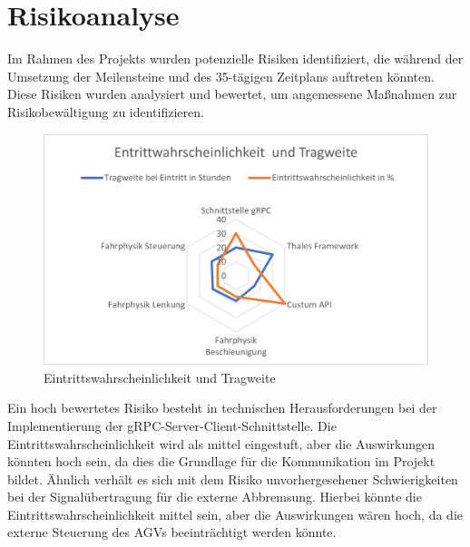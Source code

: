        



\section{Risikoanalyse}

Im Rahmen des Projekts wurden potenzielle Risiken identifiziert, die während der Umsetzung der Meilensteine und des 35-tägigen Zeitplans auftreten könnten. Diese Risiken wurden analysiert und bewertet, um angemessene Maßnahmen zur Risikobewältigung zu identifizieren.\\

\begin{figure}[htp]
    \centering
    \includegraphics[width=(\textwidth)]{images/Tragweite.png}
    \caption{Eintrittswahrscheinlichkeit und Tragweite}
    \label{fig:Eintrittswahrscheinlichkeit}
\end{figure}

Ein hoch bewertetes Risiko besteht in technischen Herausforderungen bei der Implementierung der gRPC-Server-Client-Schnittstelle. Die Eintrittswahrscheinlichkeit wird als mittel eingestuft, aber die Auswirkungen könnten hoch sein, da dies die Grundlage für die Kommunikation im Projekt bildet. Ähnlich verhält es sich mit dem Risiko unvorhergesehener Schwierigkeiten bei der Signalübertragung für die externe Abbremsung. Hierbei könnte die Eintrittswahrscheinlichkeit mittel sein, aber die Auswirkungen wären hoch, da die externe Steuerung des AGVs beeinträchtigt werden könnte.\\

